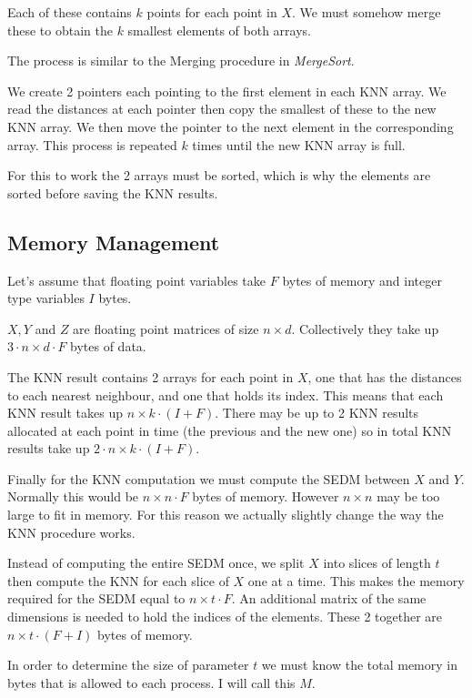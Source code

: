 \documentclass[10pt, a4paper]{article}
\begin{document}
Each of these contains $k$ points for each point in $X$. We must somehow merge these to obtain
the $k$ smallest elements of both arrays.

The process is similar to the Merging procedure in \textit{MergeSort}.

We create 2 pointers each pointing to the first element in each KNN array. We read the distances at each
pointer then copy the smallest of these to the new KNN array. We then move the pointer to the next element
in the corresponding array. This process is repeated $k$ times until the new KNN array is full.

For this to work the 2 arrays must be sorted, which is why the elements are 
sorted before saving the KNN results.

\subsection{Memory Management}
Let's assume that floating point variables take $F$ bytes of memory and integer type variables $I$ bytes.

$X, Y$ and $Z$ are floating point matrices of size $n \times d$. Collectively they take up 
$3 \cdot n \times d \cdot F$ bytes of data.

The KNN result contains 2 arrays for each point in $X$, one that has the distances to 
each nearest neighbour, and one that holds its index. This means that each KNN result takes up
$n \times k \cdot (I + F)$. 
There may be up to 2 KNN results allocated at each point in time (the previous and the new one) so in total
KNN results take up $2 \cdot n \times k \cdot (I + F)$.

Finally for the KNN computation we must compute the SEDM between $X$ and $Y$. Normally this would be
$n \times n \cdot F$ bytes of memory. However $n \times n$ may be too large to fit in memory. For this 
reason we actually slightly change the way the KNN procedure works.

Instead of computing the entire SEDM once, we split $X$ into slices of length $t$ then compute the KNN
for each slice of $X$ one at a time.
This makes the memory required for the SEDM equal to $n \times t \cdot F$. An additional matrix of the same
dimensions is needed to hold the indices of the elements. These 2 together are $n \times t \cdot (F + I)$
bytes of memory.

In order to determine the size of parameter $t$ we must know the total memory in bytes that is allowed to each
process. I will call this $M$.
\end{document}
